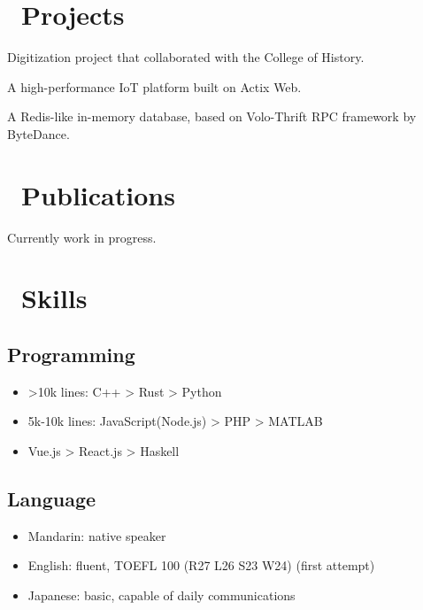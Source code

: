 \documentclass{resume}
\begin{document}
\section{\faCode\ Projects}
Digitization project that collaborated with the College of History.

A high-performance IoT platform built on Actix Web.

A Redis-like in-memory database, based on Volo-Thrift RPC framework by ByteDance.

\section{\faBookmarkO\ Publications}
Currently work in progress.

\section{\faCogs\ Skills}
\subsection{\textbf{Programming}}
\begin{itemize}[parsep=0.5ex]
  \item >10k lines: C++ > Rust > Python
  \item 5k-10k lines: JavaScript(Node.js) > PHP > MATLAB
  \item <5k lines: Java > Vue.js > React.js > Haskell
\end{itemize}
\subsection{\textbf{Language}}
\begin{itemize}[parsep=0.5ex]
  \item Mandarin: native speaker
  \item English: fluent, TOEFL 100 (R27 L26 S23 W24) (first attempt)
  \item Japanese: basic, capable of daily communications
\end{itemize}
\end{document}
